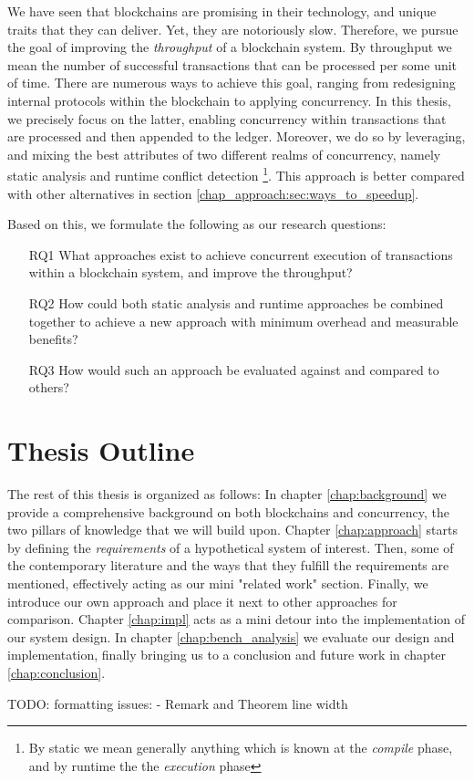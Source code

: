 We have seen that blockchains are promising in their technology, and unique traits that they can
deliver. Yet, they are notoriously slow. Therefore, we pursue the goal of improving the
\textit{throughput} of a blockchain system. By throughput we mean the number of successful
transactions that can be processed per some unit of time. There are numerous ways to
achieve this goal, ranging from redesigning internal protocols within the blockchain to applying
concurrency. In this thesis, we precisely focus on the latter, enabling concurrency within
transactions that are processed and then appended to the ledger. Moreover, we do so by leveraging,
and mixing the best attributes of two different realms of concurrency, namely static analysis and
runtime conflict detection \footnote{By static we mean generally anything which is known at the
\textit{compile} phase, and by runtime the the \textit{execution} phase}. This approach is better
compared with other alternatives in section \ref{chap_approach:sec:ways_to_speedup}.

Based on this, we formulate the following as our research questions:

 \begin{enumerate}
     \item [RQ1] What approaches exist to achieve concurrent execution of transactions within a
     blockchain system, and improve the throughput?
	 \item [RQ2] How could both static analysis and runtime approaches be combined together to
	 achieve a new approach with minimum overhead and measurable benefits?
	 \item [RQ3] How would such an approach be evaluated against and compared to others?
 \end{enumerate}

\section{Thesis Outline}
The rest of this thesis is organized as follows: In chapter \ref{chap:background} we provide a
comprehensive background on both blockchains and concurrency, the two pillars of knowledge that we
will build upon. Chapter \ref{chap:approach} starts by defining the \textit{requirements} of a
hypothetical system of interest. Then, some of the contemporary literature and the ways that they
fulfill the requirements are mentioned, effectively acting as our mini "related work" section.
Finally, we introduce our own approach and place it next to other approaches for comparison. Chapter
\ref{chap:impl} acts as a mini detour into the implementation of our system design. In chapter
\ref{chap:bench_analysis} we evaluate our design and implementation, finally bringing us to a
conclusion and future work in chapter \ref{chap:conclusion}.

TODO: formatting issues:
- Remark and Theorem line width

